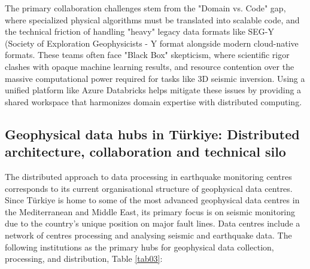 \documentclass[data,article,submit,pdftex,moreauthors]{Definitions/mdpi}
\begin{document}
The primary collaboration challenges stem from the "Domain vs. Code" gap, where specialized physical algorithms must be translated into scalable code, and the technical friction of handling "heavy" legacy data formats like SEG-Y (Society of Exploration Geophysicists - Y format alongside modern cloud-native formats. These teams often face "Black Box" skepticism, where scientific rigor clashes with opaque machine learning results, and resource contention over the massive computational power required for tasks like 3D seismic inversion. Using a unified platform like Azure Databricks helps mitigate these issues by providing a shared workspace that harmonizes domain expertise with distributed computing.

\subsection{Geophysical data hubs in Türkiye: Distributed architecture, collaboration and technical silo}
The distributed approach to data processing in earthquake monitoring centres corresponds to its current organisational structure of geophysical data centres. Since Türkiye is home to some of the most advanced geophysical data centres in the Mediterranean and Middle East, its primary focus is on seismic monitoring due to the country’s unique position on major fault lines. Data centres include a network of centres processing and analysing seismic and earthquake data. The following institutions as the primary hubs for geophysical data collection, processing, and distribution, Table \ref{tab03}:

\end{document}
